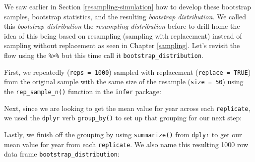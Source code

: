 \documentclass[12pt, krantz2,]{krantz}
\makeatletter
\newenvironment{Shaded}{\begin{snugshade}}{\end{snugshade}}
\newcommand{\DataTypeTok}[1]{\textcolor[rgb]{0.27,0.27,0.27}{#1}}
\newcommand{\DecValTok}[1]{\textcolor[rgb]{0.06,0.06,0.06}{#1}}
\newcommand{\KeywordTok}[1]{\textcolor[rgb]{0.27,0.27,0.27}{\textbf{#1}}}
\newcommand{\NormalTok}[1]{#1}
\newcommand{\OperatorTok}[1]{\textcolor[rgb]{0.43,0.43,0.43}{\textbf{#1}}}
\newcommand{\OtherTok}[1]{\textcolor[rgb]{0.37,0.37,0.37}{#1}}
\newcommand{\StringTok}[1]{\textcolor[rgb]{0.5,0.5,0.5}{#1}}
\newenvironment{kframe}{%
\medskip{}
\setlength{\fboxsep}{.8em}
 \def\at@end@of@kframe{}%
 \ifinner\ifhmode%
  \def\at@end@of@kframe{\end{minipage}}%
  \begin{minipage}{\columnwidth}%
 \fi\fi%
 \def\FrameCommand##1{\hskip\@totalleftmargin \hskip-\fboxsep
 \colorbox{shadecolor}{##1}\hskip-\fboxsep
     \hskip-\linewidth \hskip-\@totalleftmargin \hskip\columnwidth}%
 \MakeFramed {\advance\hsize-\width
   \@totalleftmargin\z@ \linewidth\hsize
   \@setminipage}}%
 {\par\unskip\endMakeFramed%
 \at@end@of@kframe}
\renewenvironment{Shaded}{\begin{kframe}}{\end{kframe}}
\makeatother
\begin{document}
We saw earlier in Section \ref{resampling-simulation} how to develop these bootstrap samples, bootstrap statistics, and the resulting \emph{bootstrap distribution}. We called this \emph{bootstrap distribution} the \emph{resampling distribution} before to drill home the idea of this being based on resampling (sampling with replacement) instead of sampling without replacement as seen in Chapter \ref{sampling}. Let's revisit the flow using the \texttt{\%\textgreater{}\%} but this time call it \texttt{bootstrap\_distribution}.

First, we repeatedly (\texttt{reps\ =\ 1000}) sampled with replacement (\texttt{replace\ =\ TRUE}) from the original sample with the same size of the resample (\texttt{size\ =\ 50}) using the \texttt{rep\_sample\_n()} function in the \texttt{infer} package:

\begin{Shaded}
\end{Shaded}

Next, since we are looking to get the mean value for year across each \texttt{replicate}, we used the \texttt{dplyr} verb \texttt{group\_by()} to set up that grouping for our next step:

\begin{Shaded}
\end{Shaded}

Lastly, we finish off the grouping by using \texttt{summarize()} from \texttt{dplyr} to get our mean value for year from each \texttt{replicate}. We also name this resulting 1000 row data frame \texttt{bootstrap\_distribution}:

\begin{Shaded}
\end{Shaded}
\end{document}
